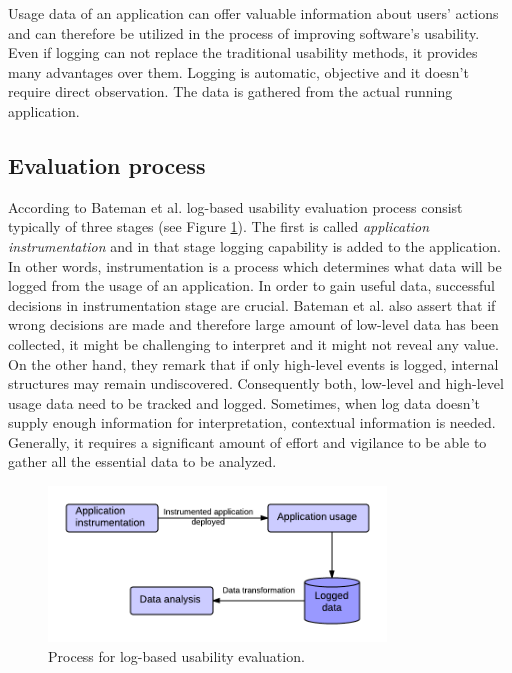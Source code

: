 \documentclass[12pt,a4paper,oneside,pdftex]{report}
\begin{document}
Usage data of an application can offer valuable information about users' actions and can therefore be utilized in the process of improving software's usability. Even if logging can not replace the traditional usability methods, it provides many advantages over them.  Logging is automatic, objective and it doesn't require direct observation. The data is gathered from the actual running application. \cite{RefWorks:24}	


\subsection{Evaluation process}

According to Bateman et al. \cite{RefWorks:24} log-based usability evaluation process consist typically of three stages (see Figure \ref{fig:logging_usability_process}). The first is called \emph{application instrumentation} and in that stage logging capability is added to the application. In other words, instrumentation is a process which determines what data will be logged from the usage of an application. In order to gain useful data, successful decisions in instrumentation stage are crucial. Bateman et al. also assert that if wrong decisions are made and therefore large amount of low-level data has been collected, it might be challenging to interpret and it might not reveal any value. On the other hand, they remark that if only high-level events is logged, internal structures may remain undiscovered. Consequently both, low-level and high-level usage data need to be tracked and logged. Sometimes, when log data doesn't supply enough information for interpretation, contextual information is needed. Generally, it requires a significant amount of effort and vigilance to be able to gather all the essential data to be analyzed. \cite{RefWorks:24}

\begin{figure}[H]
  	\centering
  	\includegraphics[width=0.8\textwidth]{./images/logging_usability_process.png}
  	\caption{Process for log-based usability evaluation. \cite{RefWorks:24}}
	\label{fig:logging_usability_process}
\end{figure}
\end{document}
